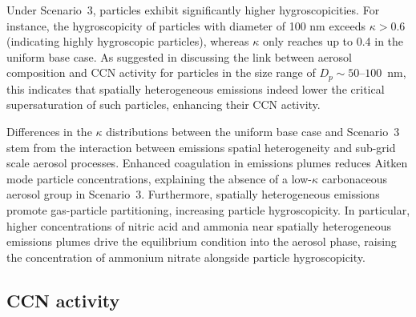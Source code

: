 \documentclass[journal abbreviation, manuscript]{copernicus}
\begin{document}
Under Scenario~3, particles exhibit significantly higher
hygroscopicities. For instance, the hygroscopicity of particles with
diameter of 100 nm exceeds $\kappa>0.6$ (indicating highly hygroscopic
particles), whereas $\kappa$ only reaches up to 0.4 in the uniform
base case. As suggested in discussing the link between aerosol 
composition and CCN activity for particles in the size range of 
$D_p\sim50\text{--}100$~nm, this indicates that spatially heterogeneous 
emissions indeed lower the critical supersaturation of such particles, 
enhancing their CCN activity.

Differences in the $\kappa$ distributions between the uniform base
case and Scenario~3 stem from the interaction between emissions
spatial heterogeneity and sub-grid scale aerosol processes. Enhanced
coagulation in emissions plumes reduces Aitken mode particle
concentrations, explaining the absence of a low-$\kappa$ carbonaceous
aerosol group in Scenario~3. Furthermore, spatially heterogeneous
emissions promote gas-particle partitioning, increasing particle
hygroscopicity. In particular, higher concentrations of nitric acid
and ammonia near spatially heterogeneous emissions plumes drive the
equilibrium condition into the aerosol phase, raising the
concentration of ammonium nitrate alongside particle hygroscopicity.


\subsection{CCN activity}\label{sec:ccn-activ}
\end{document}
